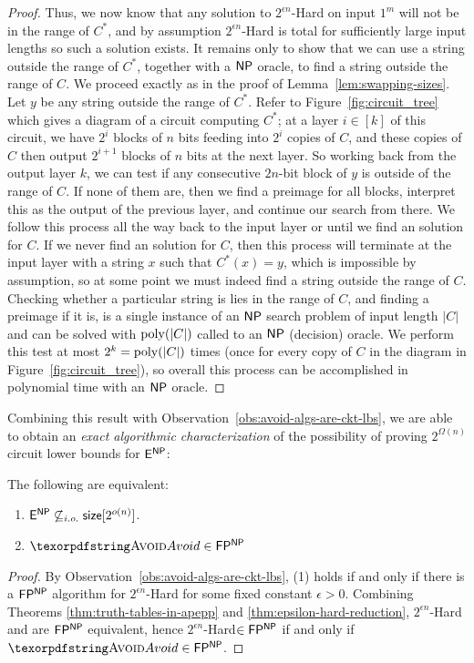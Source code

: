 \begin{proof}
 Thus, we now know that any solution to {\sc $2^{\epsilon n}$-Hard} on input $1^m$ will not be in the range of $C^*$, and by assumption {\sc $2^{\epsilon n}$-Hard} is total for sufficiently large input lengths so such a solution exists. It remains only to show that we can use a string outside the range of $C^*$, together with a $\cl{NP}$ oracle, to find a string outside the range of $C$. We proceed exactly as in the proof of Lemma~\ref{lem:swapping-sizes}. Let $y$ be any string outside the range of $C^*$. Refer to Figure~\ref{fig:circuit_tree} which gives a diagram of a circuit computing $C^*$; at a layer $i \in [k]$ of this circuit, we have $2^i$ blocks of $n$ bits feeding into $2^i$ copies of $C$, and these copies of $C$ then output $2^{i+1}$ blocks of $n$ bits at the next layer. So working back from the output layer $k$, we can test if any consecutive $2n$-bit block of $y$ is outside of the range of $C$. If none of them are, then we find a preimage for all blocks, interpret this as the output of the previous layer, and continue our search from there. We follow this process all the way back to the input layer or until we find an \avoid solution for $C$. If we never find an \avoid solution for $C$, then this process will terminate at the input layer with a string $x$ such that $C^*(x) = y$, which is impossible by assumption, so at some point we must indeed find a string outside the range of $C$. Checking whether a particular string is lies in the range of $C$, and finding a preimage if it is, is a single instance of an $\cl{NP}$ search problem of input length $|C|$ and can be solved with $\mathrm{poly}(|C|)$ called to an $\cl{NP}$ (decision) oracle. We perform this test at most $2^k = \mathrm{poly}(|C|)$ times (once for every copy of $C$ in the diagram in Figure~\ref{fig:circuit_tree}), so overall this process can be accomplished in polynomial time with an $\cl{NP}$ oracle.
\end{proof}
Combining this result with Observation~\ref{obs:avoid-algs-are-ckt-lbs}, we are able to obtain an \emph{exact algorithmic characterization} of the possibility of proving $2^{\Omega(n)}$ circuit lower bounds for $\cl{E^{NP}}$:
\begin{theorem}\label{thm:avoid-iff-enp-lb}
The following are equivalent:
\begin{enumerate}
    \item $\cl{E^{NP}} \not\subseteq_{i.o.} \cl{size}[2^{o(n)}]$.
    \item $\avoid \in \cl{FP^{NP}}$
\end{enumerate}
\end{theorem}
\begin{proof}
By Observation~\ref{obs:avoid-algs-are-ckt-lbs}, (1) holds if and only if there is a $\cl{FP^{NP}}$ algorithm for {\sc $2^{\epsilon n}$-Hard} for some fixed constant $\epsilon > 0$. Combining Theorems \ref{thm:truth-tables-in-apepp} and \ref{thm:epsilon-hard-reduction}, {\sc $2^{\epsilon n}$-Hard} and \avoid are $\cl{FP^{NP}}$ equivalent, hence {\sc $2^{\epsilon n}$-Hard}$\in \cl{FP^{NP}}$ if and only if $\avoid \in \cl{FP^{NP}}$.
\end{proof}

